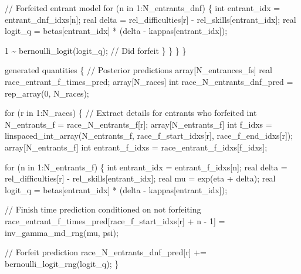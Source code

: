 \documentclass[
  letterpaper,
  DIV=11,
  numbers=noendperiod]{scrartcl}
\newenvironment{Shaded}{\begin{snugshade}}{\end{snugshade}}
\newcommand{\CommentTok}[1]{\textcolor[rgb]{0.37,0.37,0.37}{#1}}
\newcommand{\ControlFlowTok}[1]{\textcolor[rgb]{0.00,0.23,0.31}{#1}}
\newcommand{\DataTypeTok}[1]{\textcolor[rgb]{0.68,0.00,0.00}{#1}}
\newcommand{\DecValTok}[1]{\textcolor[rgb]{0.68,0.00,0.00}{#1}}
\newcommand{\KeywordTok}[1]{\textcolor[rgb]{0.00,0.23,0.31}{#1}}
\newcommand{\NormalTok}[1]{\textcolor[rgb]{0.00,0.23,0.31}{#1}}
\begin{document}
\begin{codelisting}
\begin{Shaded}
\begin{Highlighting}[]
      \CommentTok{// Forfeited entrant model}
      \ControlFlowTok{for}\NormalTok{ (n }\ControlFlowTok{in} \DecValTok{1}\NormalTok{:N\_entrants\_dnf) \{}
        \DataTypeTok{int}\NormalTok{ entrant\_idx = entrant\_dnf\_idxs[n];}
        \DataTypeTok{real}\NormalTok{ delta = rel\_difficulties[r] {-} rel\_skills[entrant\_idx];}
        \DataTypeTok{real}\NormalTok{ logit\_q = betas[entrant\_idx] * (delta {-} kappas[entrant\_idx]);}

        \DecValTok{1}\NormalTok{ \textasciitilde{} bernoulli\_logit(logit\_q); }\CommentTok{// Did forfeit}
\NormalTok{      \}}
\NormalTok{    \}}
\NormalTok{  \}}
\NormalTok{\}}

\KeywordTok{generated quantities}\NormalTok{ \{}
  \CommentTok{// Posterior predictions}
  \DataTypeTok{array}\NormalTok{[N\_entrances\_fs] }\DataTypeTok{real}\NormalTok{ race\_entrant\_f\_times\_pred;}
  \DataTypeTok{array}\NormalTok{[N\_races] }\DataTypeTok{int}\NormalTok{ race\_N\_entrants\_dnf\_pred = rep\_array(}\DecValTok{0}\NormalTok{, N\_races);}

  \ControlFlowTok{for}\NormalTok{ (r }\ControlFlowTok{in} \DecValTok{1}\NormalTok{:N\_races) \{}
    \CommentTok{// Extract details for entrants who forfeited}
    \DataTypeTok{int}\NormalTok{ N\_entrants\_f = race\_N\_entrants\_f[r];}
    \DataTypeTok{array}\NormalTok{[N\_entrants\_f] }\DataTypeTok{int}\NormalTok{ f\_idxs}
\NormalTok{      = linspaced\_int\_array(N\_entrants\_f,}
\NormalTok{                            race\_f\_start\_idxs[r],}
\NormalTok{                            race\_f\_end\_idxs[r]);}
    \DataTypeTok{array}\NormalTok{[N\_entrants\_f] }\DataTypeTok{int}\NormalTok{ entrant\_f\_idxs}
\NormalTok{      = race\_entrant\_f\_idxs[f\_idxs];}

    \ControlFlowTok{for}\NormalTok{ (n }\ControlFlowTok{in} \DecValTok{1}\NormalTok{:N\_entrants\_f) \{}
      \DataTypeTok{int}\NormalTok{ entrant\_idx = entrant\_f\_idxs[n];}
      \DataTypeTok{real}\NormalTok{ delta = rel\_difficulties[r] {-} rel\_skills[entrant\_idx];}
      \DataTypeTok{real}\NormalTok{ mu = exp(eta + delta);}
      \DataTypeTok{real}\NormalTok{ logit\_q = betas[entrant\_idx] * (delta {-} kappas[entrant\_idx]);}

      \CommentTok{// Finish time prediction conditioned on not forfeiting}
\NormalTok{      race\_entrant\_f\_times\_pred[race\_f\_start\_idxs[r] + n {-} }\DecValTok{1}\NormalTok{]}
\NormalTok{        = inv\_gamma\_md\_rng(mu, psi);}

      \CommentTok{// Forfeit prediction}
\NormalTok{      race\_N\_entrants\_dnf\_pred[r] += bernoulli\_logit\_rng(logit\_q);}
\NormalTok{    \}}


\end{Highlighting}
\end{Shaded}
\end{codelisting}
\end{document}
